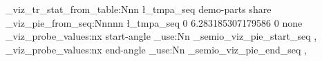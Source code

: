 \documentclass{article}
\begin{document}
\ExplSyntaxOn
{}
\semio_viz_tr_stat_from_table:Nnn \l_tmpa_seq { demo-parts } { share }
\semio_viz_pie_from_seq:Nnnnn \l_tmpa_seq { 0 } { 6.283185307179586 } { 0 } { none }
\semio_viz_probe_values:nx { start-angle } { \seq_use:Nn \g_semio_viz_pie_start_seq { , } }
\semio_viz_probe_values:nx { end-angle } { \seq_use:Nn \g_semio_viz_pie_end_seq { , } }
\ExplSyntaxOff
\end{document}
